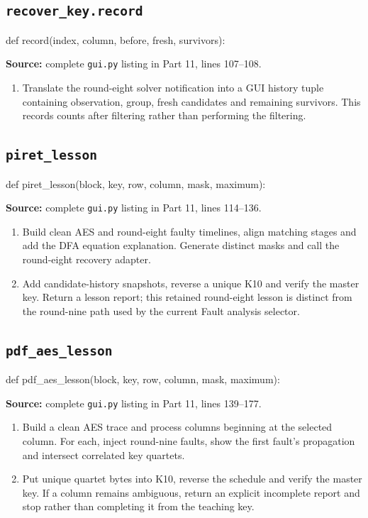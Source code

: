 \subsection{\texttt{recover\_\allowbreak{}key.record}}
\begin{lightcode}
def record(index, column, before, fresh, survivors):
\end{lightcode}
\noindent\textbf{Source:} complete \texttt{gui.py} listing in Part 11, lines 107--108.
\begin{enumerate}
\item Translate the round-eight solver notification into a GUI history tuple containing observation, group, fresh candidates and remaining survivors. This records counts after filtering rather than performing the filtering.
\end{enumerate}
\subsection{\texttt{piret\_\allowbreak{}lesson}}
\begin{lightcode}
def piret_lesson(block, key, row, column, mask, maximum):
\end{lightcode}
\noindent\textbf{Source:} complete \texttt{gui.py} listing in Part 11, lines 114--136.
\begin{enumerate}
\item Build clean AES and round-eight faulty timelines, align matching stages and add the DFA equation explanation. Generate distinct masks and call the round-eight recovery adapter.
\item Add candidate-history snapshots, reverse a unique K10 and verify the master key. Return a lesson report; this retained round-eight lesson is distinct from the round-nine path used by the current Fault analysis selector.
\end{enumerate}
\subsection{\texttt{pdf\_\allowbreak{}aes\_\allowbreak{}lesson}}
\begin{lightcode}
def pdf_aes_lesson(block, key, row, column, mask, maximum):
\end{lightcode}
\noindent\textbf{Source:} complete \texttt{gui.py} listing in Part 11, lines 139--177.
\begin{enumerate}
\item Build a clean AES trace and process columns beginning at the selected column. For each, inject round-nine faults, show the first fault's propagation and intersect correlated key quartets.
\item Put unique quartet bytes into K10, reverse the schedule and verify the master key. If a column remains ambiguous, return an explicit incomplete report and stop rather than completing it from the teaching key.
\end{enumerate}
